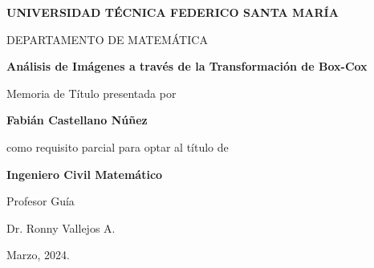 \thispagestyle{empty}

\begin{center}
\large \textbf{UNIVERSIDAD T\'ECNICA FEDERICO SANTA MAR\'IA}

\vspace{3mm}

\normalsize DEPARTAMENTO DE MATEM\'ATICA
\vspace{35mm}

\Large {\bf An\'alisis de Im\'agenes a trav\'es de la Transformaci\'on de Box-Cox}

\vspace{35mm}

\normalsize Memoria de T\'itulo presentada por

\vspace{2mm}

\large{\textbf{Fabi\'an Castellano N\'u\~nez}}

\vspace{10mm}

\normalsize como requisito parcial para optar al t\'itulo de

\vspace{2mm}

\textbf{Ingeniero Civil Matem\'atico}

\vspace{15mm}

Profesor Gu\'ia

\vspace{2mm}

Dr. Ronny Vallejos A.

\vspace{5mm}

Marzo, 2024.

\end{center}